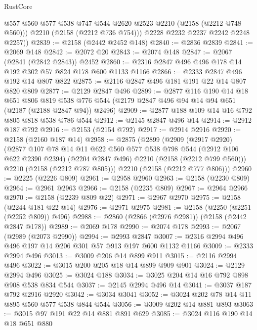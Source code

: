 \begin{lexlean}{RustCore}
\begin{coremodule}
            @557
            @560
            @577
            @538
            @747
            @544
            @2620
            @2523
            @2210
            (@2158 (@2212 @748 @560)))
          @2210
          (@2158 (@2212 @736 @754)))
        @2228
        @2232
        @2237
        @2242
        @2248
        @2257))
@2839 := @2158 (@2442 @2452 @148)
@2840 := @2836 @2839
@2841 := @2069 @148
@2842 := @2072 @20
@2843 := @2074 @148
@2847 := @2067 (@2841 (@2842 @2843)) @2452
@2860 := @2316 @2847 @496 @496 @178 @14 @192 @302 @57 @824 @178 @600 @1133 @1166
@2866 := @2333 @2847 @496 @192 @14 @807 @822
@2875 := @2116 @2847 @496 @181 @191 @22 @14 @807 @820 @809
@2877 := @2129 @2847 @496
@2899 := @2877
    @116
    @190
    @14
    @18
    @651
    @806
    @819
    @538
    @776
    @544
    (@2179 @2847 @496 @94 @14 @94 @651 (@2187 (@2188 @2847 @94)) @2496)
@2909 := @2877 @188 @109 @14 @16 @792 @805 @818 @538 @786 @544
@2912 := @2145 @2847 @496 @14
@2914 := @2912 @187 @792
@2916 := @2153 (@2154 @792)
@2917 := @2914 @2916
@2920 := @2158 (@2160 @187 @14)
@2958 := @2875
    (@2899
      (@2909
        (@2917 @2920)
        (@2877
          @107
          @78
          @14
          @11
          @622
          @560
          @577
          @538
          @798
          @544
          (@2912 @106 @622 @2390 @2394)
          (@2204 @2847 @496)
          @2210
          (@2158 (@2212 @799 @560)))
        @2210
        (@2158 (@2212 @787 @805)))
      @2210
      (@2158 (@2212 @777 @806)))
@2960 := @2225 (@2226 @809)
@2961 := @2958 @2960
@2963 := @2158 (@2230 @809)
@2964 := @2961 @2963
@2966 := @2158 (@2235 @809)
@2967 := @2964 @2966
@2970 := @2158 (@2239 @809 @22)
@2971 := @2967 @2970
@2975 := @2158 (@2244 @181 @22 @14)
@2976 := @2971 @2975
@2981 := @2158 (@2250 (@2251 (@2252 @809)) @496)
@2988 := @2860 (@2866 (@2976 @2981)) (@2158 (@2442 @2847 @178))
@2989 := @2069 @178
@2990 := @2074 @178
@2993 := @2067 (@2989 (@2073 @2990))
@2994 := @2993 @2847
@3007 := @2316 @2994 @496 @496 @197 @14 @206 @301 @57 @913 @197 @600 @1132 @1166
@3009 := @2333 @2994 @496
@3013 := @3009 @206 @14 @899 @911
@3015 := @2116 @2994 @496
@3022 := @3015 @200 @205 @18 @14 @899 @909 @901
@3024 := @2129 @2994 @496
@3025 := @3024 @188
@3034 := @3025 @204 @14 @16 @792 @898 @908 @538 @834 @544
@3037 := @2145 @2994 @496 @14
@3041 := @3037 @187 @792 @2916 @2920
@3042 := @3034 @3041
@3052 := @3024 @202 @78 @14 @11 @895 @560 @577 @538 @844 @544
@3056 := @3009 @202 @14 @881 @893
@3063 := @3015 @97 @191 @22 @14 @881 @891 @629
@3085 := @3024
    @116
    @190
    @14
    @18
    @651
    @880

\end{coremodule}
\end{lexlean}
